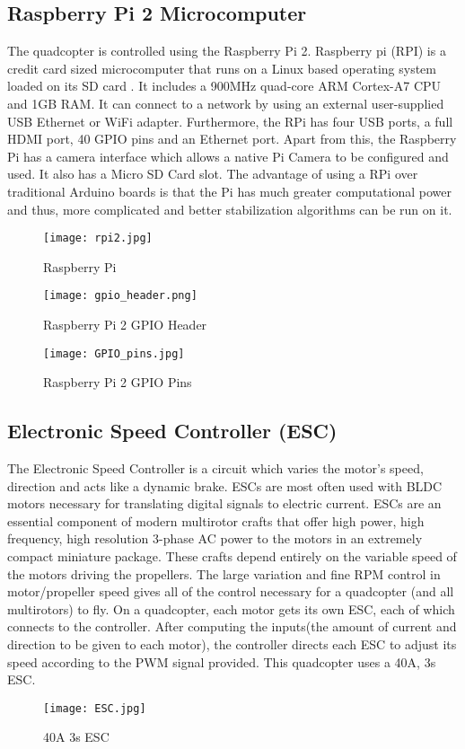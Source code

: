 \subsection{Raspberry Pi 2 Microcomputer}
The quadcopter is controlled using the Raspberry Pi 2. Raspberry pi (RPI) is a credit card sized microcomputer that runs on a Linux based operating system loaded on its SD card . It includes a 900MHz quad-core ARM Cortex-A7 CPU and 1GB RAM.
\newline
It can connect to a network by using an external user-supplied USB Ethernet or WiFi adapter. Furthermore, the RPi has four USB ports, a full HDMI port, 40 GPIO pins and an Ethernet port. Apart from this, the Raspberry Pi has a camera interface which allows a native Pi Camera to be configured and used. It also has a Micro SD Card slot. The advantage of using a RPi over traditional Arduino boards is that the Pi has much greater computational power and thus, more complicated and better stabilization algorithms can be run on it. 

\begin{figure}[H]
  \centering
  \texttt{[image: rpi2.jpg]}
  \caption{Raspberry Pi}
  \label{RPi}	
\end{figure}

\begin{figure}[H]
  \centering
  \texttt{[image: gpio\_header.png]}
  \caption{Raspberry Pi 2 GPIO Header}
  \label{RPi Pins} 
\end{figure}
\begin{figure}[H]
  \centering
  \texttt{[image: GPIO\_pins.jpg]}
  \caption{Raspberry Pi 2 GPIO Pins}
  \label{RPi Pins} 
\end{figure}


\subsection{Electronic Speed Controller (ESC)}
The Electronic Speed Controller is a circuit which varies the motor's speed, direction and acts like a dynamic brake. ESCs are most often used with BLDC motors necessary for translating digital signals to electric current. ESCs are an essential component of modern multirotor crafts that offer high power, high frequency, high resolution 3-phase AC power to the motors in an extremely compact miniature package. These crafts depend entirely on the variable speed of the motors driving the propellers. 
\newline
The large variation and fine RPM control in motor/propeller speed gives all of the control necessary for a quadcopter (and all multirotors) to fly. On a quadcopter, each motor gets its own ESC, each of which connects to the controller. After computing the inputs(the amount of current and direction to be given to each motor), the controller directs each ESC to adjust its speed according to the PWM signal provided.
This quadcopter uses a 40A, 3s ESC.
\begin{figure}[H]
  \centering
  \texttt{[image: ESC.jpg]}
  \caption{40A 3s ESC}
  \label{40A 3s ESC}	
\end{figure}



